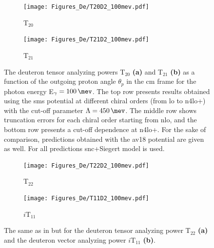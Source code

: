     \begin{figure}[htb]
        \centering
        \begin{subfigure}[b]{0.46\textwidth}
            \caption{T$_{20}$}
            \texttt{[image: Figures\_De/T20D2\_100mev.pdf]}
            \label{T20_100_vert}
        \end{subfigure}
        \begin{subfigure}[b]{0.46\textwidth}
            \caption{T$_{21}$}
            \texttt{[image: Figures\_De/T21D2\_100mev.pdf]}
            \label{T21_100_vert}
        \end{subfigure}
        \caption{The deuteron tensor analyzing powers T$_{20}$  {\bf (a)}
        and T$_{21}$ {\bf (b)}
        as a function of the outgoing proton angle $\theta_p$ in the \gls{cm} frame 
        for the photon energy E$_\gamma=\SI{100}{\mev}$.
        The top row presents results obtained using the \gls{sms} potential
        at different chiral orders (from \gls{lo} to \gls{n4lo+}) with the cut-off parameter $\Lambda=\SI{450}{\mev}$.
        The middle row shows truncation errors for each 
        chiral order starting from \gls{nlo}, and the
        bottom row presents a cut-off dependence at \gls{n4lo+}.
        For the sake of comparison, predictions obtained with the \gls{av18} potential are given as well.
        For all predictions \gls{snc}+Siegert model is used.}
        \label{T20_T21_100}
    \end{figure}

    \begin{figure}[htb]
        \centering
        \begin{subfigure}[b]{0.46\textwidth}
            \caption{T$_{22}$}
            \texttt{[image: Figures\_De/T22D2\_100mev.pdf]}
            \label{T22_100_vert}
        \end{subfigure}
        \begin{subfigure}[b]{0.46\textwidth}
            \caption{$i\text{T}_{11}$}
            \texttt{[image: Figures\_De/T11D2\_100mev.pdf]}
            \label{T11_100_vert}
        \end{subfigure}
        \caption{The same as in  but for the deuteron tensor analyzing power
        T$_{22}$ {\bf (a)} and
        the deuteron vector analyzing power $i\text{T}_{11}$ {\bf (b)}.}
        \label{T22_T11_100}
    \end{figure}

